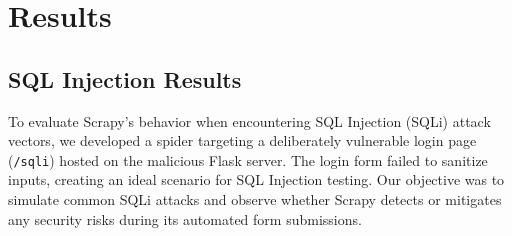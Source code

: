 


\section{Results}

\subsection{SQL Injection Results}
To evaluate Scrapy’s behavior when encountering SQL Injection (SQLi) attack vectors, we developed a spider targeting a deliberately vulnerable login page (\texttt{/sqli}) hosted on the malicious Flask server. The login form failed to sanitize inputs, creating an ideal scenario for SQL Injection testing. Our objective was to simulate common SQLi attacks and observe whether Scrapy detects or mitigates any security risks during its automated form submissions.

